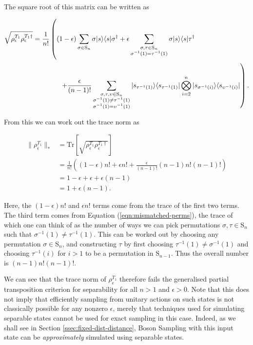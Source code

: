 \noindent The square root of this matrix can be written as

\begin{align}
\sqrt{\rho_{\epsilon}^{T_1}\rho_{\epsilon}^{T_1\dagger}} &= \frac{1}{n!}\left(\vphantom{\sum_{\substack{a\\b\\c\\d}}}(1-\epsilon)\sum_{\sigma\in \textrm{S}_n}\sigma|s\rangle\langle s|\sigma^\dagger + \epsilon\sum_{\substack{\sigma,\tau \in \textrm{S}_n\\\sigma^{-1}(1) = \tau^{-1}(1)}}\sigma|s\rangle\langle s|\tau^\dagger\right.\nonumber\\
&\quad\quad\quad\quad\left.+\frac{\epsilon}{(n-1)!}\sum_{\substack{\sigma,\tau,\upsilon \in \textrm{S}_n\\\sigma^{-1}(1) \neq \tau^{-1}(1)\\\sigma^{-1}(1) = \upsilon^{-1}(1)}}|s_{\tau^{-1}(1)}\rangle\langle s_{\tau^{-1}(1)}|\bigotimes_{i=2}^n|s_{\sigma^{-1}(i)}\rangle\langle s_{\upsilon^{-1}(i)}|\right).\label{eqn:mismatched-perms}
\end{align}

\noindent From this we can work out the trace norm as

\begin{align}
\|\rho_{\epsilon}^{T_1}\|_*
 &= \textrm{Tr}\left[\sqrt{\rho_\epsilon^{T_1}\rho_\epsilon^{T_1\dagger}}\right]\\
 &= \frac{1}{n!}\left((1-\epsilon)n! + \epsilon n! + \frac{\epsilon}{(n-1)!}(n-1)n!(n-1)!\right)\\
 &= 1-\epsilon + \epsilon+\epsilon(n-1)\\
 &= 1+\epsilon(n-1).
\end{align}

Here, the $(1-\epsilon)n!$ and $\epsilon n!$ terms come from the trace of the first two terms. 
The third term comes from Equation (\ref{eqn:mismatched-perms}), the trace of which one can think of as the number of ways we can pick permutations $\sigma,\tau\in\textrm{S}_n$ such that $\sigma^{-1}(1)\neq\tau^{-1}(1)$. 
This can be worked out by choosing any permutation $\sigma \in \textrm{S}_n$, and constructing $\tau$ by first choosing $\tau^{-1}(1)\neq\sigma^{-1}(1)$ and choosing $\tau^{-1}(i)$ for $i>1$ to be a permutation in $\textrm{S}_{n-1}$. 
Thus the overall number is $(n-1)n!(n-1)!$.

We can see that the trace norm of $\rho_\epsilon^{T_1}$ therefore fails the generalised partial transposition criterion for separability for all $n>1$ and $\epsilon>0$.
Note that this does not imply that efficiently sampling from unitary actions on such states is not classically possible for any nonzero $\epsilon$, merely that techniques used for simulating separable states cannot be used for exact sampling in this case. Indeed, as we shall see in Section \ref{ssec:fixed-dist-distance}, Boson Sampling with this input state can be \textit{approximately} simulated using separable states.

